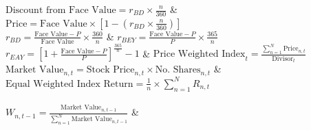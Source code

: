 $\text{Discount from Face Value} = r_{BD} \times \frac{n}{360}$ & $\text{Price} = \text{Face Value} \times \left[1 - \left(r_{BD} \times \frac{n}{360}\right)\right]$ \\

$r_{BD} = \frac{\text{Face Value} - P}{\text{Face Value}} \times \frac{360}{n}$ & $r_{BEY} = \frac{\text{Face Value} - P}{P} \times \frac{365}{n}$ \\

$r_{EAY} = \left[1 + \frac{\text{Face Value} - P}{P}\right]^{\frac{365}{n}} - 1$ & $\text{Price Weighted Index}_{t} = \frac{\sum_{n=1}^{N} \text{Price}_{n,t}}{\text{Divisor}_{t}}$ \\

$\text{Market Value}_{n,t} = \text{Stock Price}_{n,t} \times \text{No. Shares}_{n,t}$ & $\text{Equal Weighted Index Return} = \frac{1}{n} \times \sum_{n=1}^{N} R_{n,t}$ \\

 \\

$W_{n,t-1} = \frac{\text{Market Value}_{n,t-1}}{\sum_{n=1}^{N} \text{Market Value}_{n,t-1}}$ & \\
